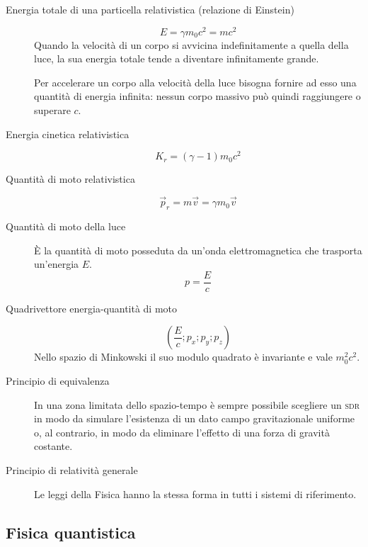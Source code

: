 \documentclass[a4paper,11pt,italian]{article}
\begin{document}
\begin{description}
  \item[Energia totale di una particella relativistica (relazione di Einstein)]
  \[ E = \gamma m_0 c^2 = mc^2\]
  Quando la velocità di un corpo si avvicina indefinitamente a quella della luce, la sua energia totale tende a diventare infinitamente grande.
  
  Per accelerare un corpo alla velocità della luce bisogna fornire ad esso una quantità di energia infinita: nessun corpo massivo può quindi raggiungere o superare $ c $.
  
  \item[Energia cinetica relativistica] 
  \[ K_r = (\gamma -1) m_0 c^2 \]

  \item[Quantità di moto relativistica] 
  \[ \vec{p}_r = m \vec{v} = \gamma m_0 \vec{v} \]

  \item[Quantità di moto della luce] È la quantità di moto posseduta da un'onda elettromagnetica che trasporta un'energia $ E $.
  \[ p = \frac{E}{c} \]

  \item[Quadrivettore energia-quantità di moto]
  \[ \left( \frac{E}{c}; p_x ; p_y ; p_z \right) \]
  Nello spazio di Minkowski il suo modulo quadrato è invariante e vale $ m_0^2 c^2 $.
  
  \item[Principio di equivalenza] In una zona limitata dello spazio-tempo è sempre possibile scegliere un \textsc{sdr} in modo da simulare l'esistenza di un dato campo gravitazionale uniforme o, al contrario, in modo da eliminare l'effetto di una forza di gravità costante.
  
  \item[Principio di relatività generale]
  Le leggi della Fisica hanno la stessa forma in tutti i sistemi di riferimento.
\end{description}

\subsection{Fisica quantistica}
\end{document}
